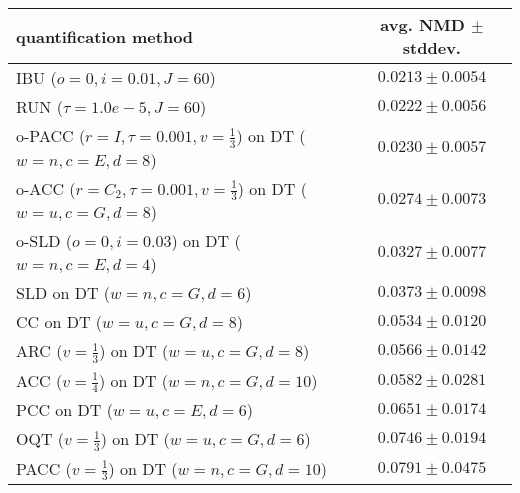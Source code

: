 \begin{tabular}{lc}
  \toprule
  quantification method & avg. NMD $\pm$ stddev. \\
  \midrule
  IBU ($o=0, i=0.01, J=60$) & $\mathbf{0.0213 \pm 0.0054}$ \\
  RUN ($\tau=1.0e-5, J=60$) & $0.0222 \pm 0.0056$ \\
  o-PACC ($r=I, \tau=0.001, v=\frac{1}{3}$) on DT ($w=n, c=E, d=8$) & $0.0230 \pm 0.0057$ \\
  o-ACC ($r=C_2, \tau=0.001, v=\frac{1}{3}$) on DT ($w=u, c=G, d=8$) & $0.0274 \pm 0.0073$ \\
  o-SLD ($o=0, i=0.03$) on DT ($w=n, c=E, d=4$) & $0.0327 \pm 0.0077$ \\
  SLD on DT ($w=n, c=G, d=6$) & $0.0373 \pm 0.0098$ \\
  CC on DT ($w=u, c=G, d=8$) & $0.0534 \pm 0.0120$ \\
  ARC ($v=\frac{1}{3}$) on DT ($w=u, c=G, d=8$) & $0.0566 \pm 0.0142$ \\
  ACC ($v=\frac{1}{4}$) on DT ($w=n, c=G, d=10$) & $0.0582 \pm 0.0281$ \\
  PCC on DT ($w=u, c=E, d=6$) & $0.0651 \pm 0.0174$ \\
  OQT ($v=\frac{1}{3}$) on DT ($w=u, c=G, d=6$) & $0.0746 \pm 0.0194$ \\
  PACC ($v=\frac{1}{3}$) on DT ($w=n, c=G, d=10$) & $0.0791 \pm 0.0475$ \\
  \bottomrule
\end{tabular}
